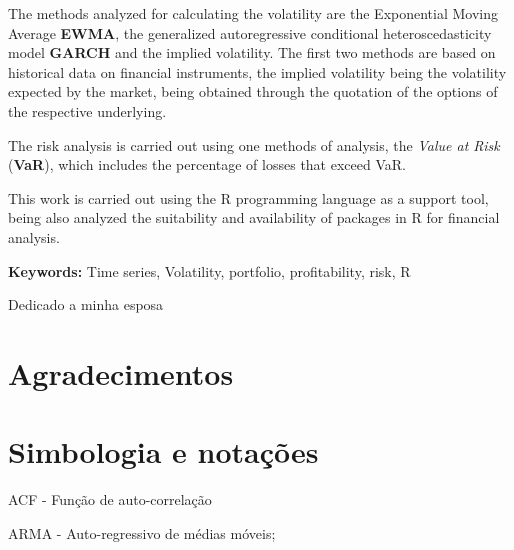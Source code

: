 \documentclass[
  12pt,
  a4paper,
  openany]{book}
\theoremstyle{definition}
\theoremstyle{definition}
\theoremstyle{definition}
\theoremstyle{remark}
\begin{document}
The methods analyzed for calculating the volatility are the Exponential Moving Average \textbf{EWMA}, the generalized autoregressive conditional heteroscedasticity model \textbf{GARCH} and the implied volatility. The first two methods are based on historical data on financial instruments, the implied volatility being the volatility expected by the market, being obtained through the quotation of the options of the respective underlying.

The risk analysis is carried out using one methods of analysis, the \emph{Value at Risk} (\textbf{VaR}), which includes the percentage of losses that exceed VaR.

This work is carried out using the R programming language as a support tool, being also analyzed the suitability and availability of packages in R for financial analysis.

\bigbreak

\noindent\textbf{Keywords:} Time series, Volatility, portfolio, profitability, risk, R

\newenvironment{dedication}
  {\clearpage           %
   \itshape             %
   \raggedleft          %
  }
  {\par %
   \vspace{\stretch{3}} %
   \clearpage           %
  }
\begin{dedication}
{\Large Dedicado a minha esposa\par}
\end{dedication}

\chapter*{Agradecimentos}

\renewcommand*\contentsname{Índice}
{
\setcounter{tocdepth}{2}
\tableofcontents
}
\listoftables
\listoffigures
{}
\hypertarget{simbologia-e-notauxe7uxf5es}{%
\chapter*{Simbologia e notações}\label{simbologia-e-notauxe7uxf5es}}

ACF - Função de auto-correlação

ARMA - Auto-regressivo de médias móveis;\\
\end{document}
